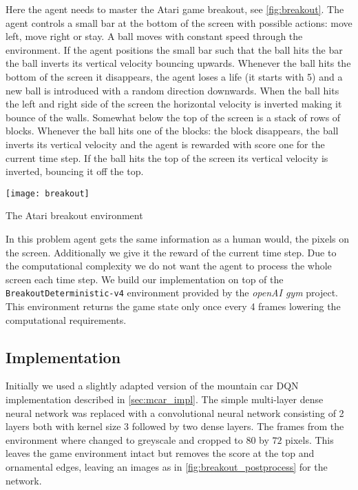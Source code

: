 \label{sec:breakout}
Here the agent needs to master the Atari game breakout, see \autoref{fig:breakout}. The agent controls a small bar at the bottom of the screen with possible actions: move left, move right or stay. A ball moves with constant speed through the environment. If the agent positions the small bar such that the ball hits the bar the ball inverts its vertical velocity bouncing upwards. Whenever the ball hits the bottom of the screen it disappears, the agent loses a life (it starts with 5) and a new ball is introduced with a random direction downwards. When the ball hits the left and right side of the screen the horizontal velocity is inverted making it bounce of the walls. Somewhat below the top of the screen is a stack of rows of blocks. Whenever the ball hits one of the blocks: the block disappears, the ball inverts its vertical velocity and the agent is rewarded with score one for the current time step. If the ball hits the top of the screen its vertical velocity is inverted, bouncing it off the top. 

\begin{marginfigure}
    \texttt{[image: breakout]}
    \caption{The Atari breakout environment}
    \label{fig:breakout}
\end{marginfigure}

In this problem agent gets the same information as a human would, the pixels on the screen. Additionally we give it the reward of the current time step. Due to the computational complexity we do not want the agent to process the whole screen each time step. We build our implementation on top of the \texttt{BreakoutDeterministic-v4} environment provided by the \textit{openAI gym} project. This environment returns the game state only once every 4 frames lowering the computational requirements.

\subsection{Implementation}
Initially we used a slightly adapted version of the mountain car DQN implementation described in \autoref{sec:mcar_impl}. The simple multi-layer dense neural network was replaced with a convolutional neural network consisting of 2 layers both with kernel size 3 followed by two dense layers. The frames from the environment where changed to greyscale and cropped to $80$ by $72$ pixels. This leaves the game environment intact but removes the score at the top and ornamental edges, leaving an images as in \autoref{fig:breakout_postprocess} for the network.

